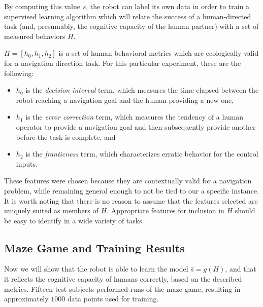 \documentclass{sig-alternate}
\begin{document}

By computing this value $s$, the robot can label its own data in order
to train a supervised learning algorithm which will relate the success
of a human-directed task (and, presumably, the cognitive capacity of
the human partner) with a set of measured behaviors $H$.

$H = [h_0, h_1, h_2]$ is a set of human behavioral metrics which are
ecologically valid for a navigation direction task.  For this
particular experiment, these are the following:

\begin{itemize}
\item $h_0$ is the \emph{decision interval} term, which measures the
  time elapsed between the robot reaching a navigation goal and the
  human providing a new one,
\item $h_1$ is the \emph{error correction} term, which measures the
  tendency of a human operator to provide a navigation goal and then
  subsequently provide another before the task is complete, and
\item $h_2$ is the \emph{franticness} term, which characterizes erratic behavior for the control inputs.
\end{itemize}

These features were chosen because they are contextually valid for a navigation problem, while remaining general enough to not be tied to our a specific instance. It is worth noting that there is no reason to
assume that the features selected are  uniquely suited as members of $H$.
Appropriate features for inclusion in $H$ should be easy to identify
in a wide variety of tasks.

\subsection{Maze Game and Training Results}
Now we will show that the robot is able to learn the model $\hat{s} =
g(H)$, and that it reflects the cognitive capacity of humans
correctly, based on the described metrics.  Fifteen test subjects
performed runs of the maze game, resulting in approximately $1000$
data points used for training.

\end{document}

